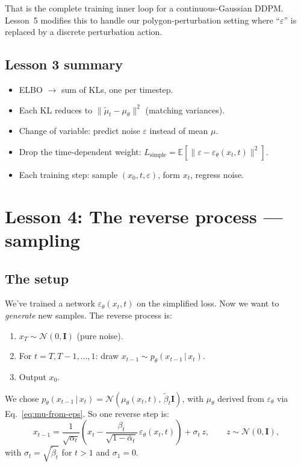 \documentclass[11pt,a4paper]{article}
\newcommand{\E}{\mathbb{E}}
\newcommand{\N}{\mathcal{N}}
\newcommand{\given}{\,|\,}
\newcommand{\eps}{\varepsilon}
\begin{document}
That is the complete training inner loop for a continuous-Gaussian DDPM.
Lesson~5 modifies this to handle our polygon-perturbation setting where
``$\eps$'' is replaced by a discrete perturbation action.

\subsection{Lesson 3 summary}

\begin{itemize}[leftmargin=*]
\item ELBO $\to$ sum of KLs, one per timestep.
\item Each KL reduces to $\|\tilde\mu_t - \mu_\theta\|^2$ (matching variances).
\item Change of variable: predict noise $\eps$ instead of mean $\mu$.
\item Drop the time-dependent weight: $L_{\text{simple}} = \E[\|\eps - \eps_\theta(x_t, t)\|^2]$.
\item Each training step: sample $(x_0, t, \eps)$, form $x_t$, regress noise.
\end{itemize}

\section{Lesson 4: The reverse process --- sampling}

\subsection{The setup}

We've trained a network $\eps_\theta(x_t, t)$ on the simplified loss.
Now we want to \emph{generate} new samples. The reverse process is:
\begin{enumerate}[leftmargin=*]
\item $x_T \sim \N(0, \mathbf{I})$ (pure noise).
\item For $t = T, T{-}1, \ldots, 1$: draw $x_{t-1} \sim p_\theta(x_{t-1}\given x_t)$.
\item Output $x_0$.
\end{enumerate}
We chose $p_\theta(x_{t-1}\given x_t) = \N(\mu_\theta(x_t, t),\,\tilde\beta_t\mathbf{I})$,
with $\mu_\theta$ derived from $\eps_\theta$ via Eq.~\eqref{eq:mu-from-eps}.
So one reverse step is:
\begin{equation}
\boxed{\;
x_{t-1} = \frac{1}{\sqrt{\alpha_t}}\!\left(x_t - \frac{\beta_t}{\sqrt{1-\bar{\alpha}_t}}\,\eps_\theta(x_t, t)\right) + \sigma_t\, z,
\qquad z \sim \N(0, \mathbf{I}),\;}
\label{eq:rev-step}
\end{equation}
with $\sigma_t = \sqrt{\tilde\beta_t}$ for $t > 1$ and $\sigma_1 = 0$.
\end{document}
